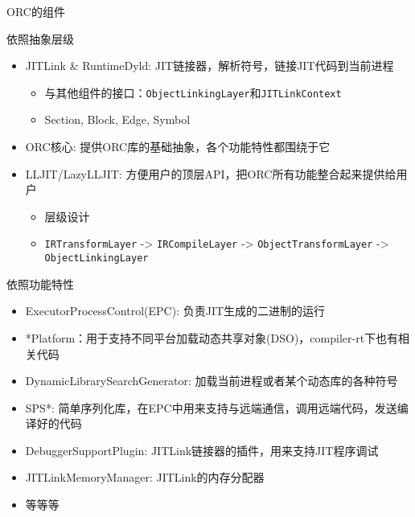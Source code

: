 \documentclass[
  8pt,
  ignorenonframetext,
  aspectratio=169]{beamer}
\providecommand{\tightlist}{%
  \setlength{\itemsep}{0pt}\setlength{\parskip}{0pt}}
\begin{document}
\begin{frame}[fragile]{ORC的组件}
\protect\hypertarget{orcux7684ux7ec4ux4ef6}{}
\begin{block}{依照抽象层级}
\protect\hypertarget{ux4f9dux7167ux62bdux8c61ux5c42ux7ea7}{}
\begin{itemize}
\tightlist
\item
  JITLink \& RuntimeDyld: JIT链接器，解析符号，链接JIT代码到当前进程

  \begin{itemize}
  \tightlist
  \item
    与其他组件的接口：\texttt{ObjectLinkingLayer}和\texttt{JITLinkContext}
  \item
    Section, Block, Edge, Symbol
  \end{itemize}
\item
  ORC核心: 提供ORC库的基础抽象，各个功能特性都围绕于它
\item
  LLJIT/LazyLLJIT: 方便用户的顶层API，把ORC所有功能整合起来提供给用户

  \begin{itemize}
  \tightlist
  \item
    层级设计
  \item
    \texttt{IRTransformLayer} -\textgreater{} \texttt{IRCompileLayer}
    -\textgreater{} \texttt{ObjectTransformLayer} -\textgreater{}
    \texttt{ObjectLinkingLayer}
  \end{itemize}
\end{itemize}
\end{block}

\begin{block}{依照功能特性}
\protect\hypertarget{ux4f9dux7167ux529fux80fdux7279ux6027}{}
\begin{itemize}
\tightlist
\item
  ExecutorProcessControl(EPC): 负责JIT生成的二进制的运行
\item
  *Platform：用于支持不同平台加载动态共享对象(DSO)，compiler-rt下也有相关代码
\item
  DynamicLibrarySearchGenerator: 加载当前进程或者某个动态库的各种符号
\item
  SPS*:
  简单序列化库，在EPC中用来支持与远端通信，调用远端代码，发送编译好的代码
\item
  DebuggerSupportPlugin: JITLink链接器的插件，用来支持JIT程序调试
\item
  JITLinkMemoryManager: JITLink的内存分配器
\item
  等等等
\end{itemize}
\end{block}
\end{frame}
\end{document}
